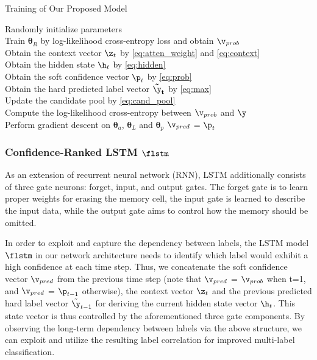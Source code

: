 \documentclass[letterpaper]{article} %
\begin{document}
{\color{blue}
\begin{algorithm}[t]
\label{alg:training}
\DontPrintSemicolon
\caption{Training of Our Proposed Model}

\BlankLine
Randomly initialize parameters\\
Train $\mathbf{\theta}_R$ by log-likelihood cross-entropy loss and obtain $\mathbf{\v}_{prob}$\\
{
{
Obtain the context vector $\mathbf{\z}_t$ by \eqref{eq:atten_weight} and \eqref{eq:context}\\
Obtain the hidden state $\mathbf{\h}_t$ by \eqref{eq:hidden}\\
Obtain the soft confidence vector $\mathbf{\p}_t$ by \eqref{eq:prob}\\
Obtain the hard predicted label vector $\mathbf{\tilde{\y}_t}$ by \eqref{eq:max}\\
Update the candidate pool by \eqref{eq:cand_pool}\\
Compute the log-likelihood cross-entropy between $\mathbf{\v}_{prob}$ and $\mathbf{\y}$\\
Perform gradient descent on $\mathbf{\theta}_a$, $\mathbf{\theta}_L$ and $\mathbf{\theta}_p$
$\mathbf{\v}_{pred}$ = $\mathbf{\p}_t$
}
}
\end{algorithm}
}

\subsubsection{Confidence-Ranked LSTM $\flstm$}
\label{LSTM}
As an extension of recurrent neural network (RNN), LSTM additionally consists of three gate neurons: forget, input, and output gates. The forget gate is to learn proper weights for erasing the memory cell, the input gate is learned to describe the input data, while the output gate aims to control how the memory should be omitted.

In order to exploit and capture the dependency between labels, the LSTM model $\flstm$ in our network architecture needs to identify which label would exhibit a high confidence at each time step. Thus, we concatenate the soft confidence vector $\v_{pred}$ from the previous time step (note that $\v_{pred}$ = $\v_{prob}$ when t=1, and $\v_{pred}$ = $\p_{t-1}$ otherwise), the context vector $\z_t$ and the previous predicted hard label vector $\tilde{\y}_{t-1}$ for deriving the current hidden state vector $\h_t$. This state vector is thus controlled by the aforementioned three gate components. By observing the long-term dependency between labels via the above structure, we can exploit and utilize the resulting label correlation for improved multi-label classification.
\end{document}
